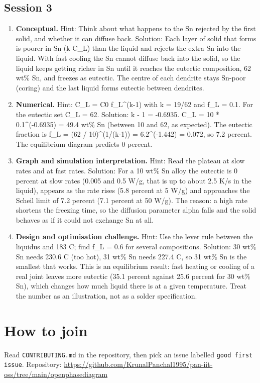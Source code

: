 \documentclass[11pt,a4paper]{article}
\begin{document}
\subsection*{Session 3}
\begin{enumerate}[nosep]
\item \textbf{Conceptual.} Hint: Think about what happens to the Sn rejected by the first solid, and whether it can diffuse back. Solution: Each layer of solid that forms is poorer in Sn (k C\_L) than the liquid and rejects the extra Sn into the liquid. With fast cooling the Sn cannot diffuse back into the solid, so the liquid keeps getting richer in Sn until it reaches the eutectic composition, 62 wt\% Sn, and freezes as eutectic. The centre of each dendrite stays Sn-poor (coring) and the last liquid forms eutectic between dendrites.
\item \textbf{Numerical.} Hint: C\_L = C0 f\_L\textasciicircum{}(k-1) with k = 19/62 and f\_L = 0.1. For the eutectic set C\_L = 62. Solution: k - 1 = -0.6935. C\_L = 10 * 0.1\textasciicircum{}(-0.6935) = 49.4 wt\% Sn (between 10 and 62, as expected). The eutectic fraction is f\_L = (62 / 10)\textasciicircum{}(1/(k-1)) = 6.2\textasciicircum{}(-1.442) = 0.072, so 7.2 percent. The equilibrium diagram predicts 0 percent.
\item \textbf{Graph and simulation interpretation.} Hint: Read the plateau at slow rates and at fast rates. Solution: For a 10 wt\% Sn alloy the eutectic is 0 percent at slow rates (0.005 and 0.5 W/g, that is up to about 2.5 K/s in the liquid), appears as the rate rises (5.8 percent at 5 W/g) and approaches the Scheil limit of 7.2 percent (7.1 percent at 50 W/g). The reason: a high rate shortens the freezing time, so the diffusion parameter alpha falls and the solid behaves as if it could not exchange Sn at all.
\item \textbf{Design and optimisation challenge.} Hint: Use the lever rule between the liquidus and 183 C; find f\_L = 0.6 for several compositions. Solution: 30 wt\% Sn needs 230.6 C (too hot), 31 wt\% Sn needs 227.4 C, so 31 wt\% Sn is the smallest that works. This is an equilibrium result: fast heating or cooling of a real joint leaves more eutectic (35.1 percent against 25.6 percent for 30 wt\% Sn), which changes how much liquid there is at a given temperature. Treat the number as an illustration, not as a solder specification.
\end{enumerate}

\section{How to join}
Read \texttt{CONTRIBUTING.md} in the repository, then pick an issue labelled \texttt{good first issue}. Repository: \url{https://github.com/KrunalPanchal1995/pan-iit-oss/tree/main/openphasediagram}
\end{document}
